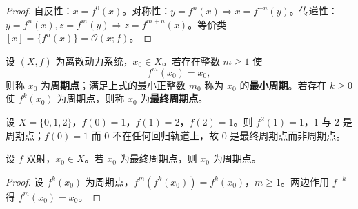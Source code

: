 \begin{proof}
自反性：$x=f^0(x)$。对称性：$y=f^n(x)\Rightarrow x=f^{-n}(y)$。传递性：$y=f^n(x),z=f^m(y)\Rightarrow z=f^{m+n}(x)$。等价类 $[x]=\{f^n(x)\}=\mathcal{O}(x;f)$。
\end{proof}

\begin{definition}[周期点与最终周期点]\label{def:periodic_point}
设 $(X,f)$ 为离散动力系统，$x_0\in X$。若存在整数 $m\ge 1$ 使
\[
f^m(x_0)=x_0,
\]
则称 $x_0$ 为\textbf{周期点}；满足上式的最小正整数 $m_0$ 称为 $x_0$ 的\textbf{最小周期}。若存在 $k\ge 0$ 使 $f^k(x_0)$ 为周期点，则称 $x_0$ 为\textbf{最终周期点}。
\end{definition}

\begin{example}[最终周期而非周期的点]\label{ex:eventually_periodic}
设 $X=\{0,1,2\}$，$f(0)=1$，$f(1)=2$，$f(2)=1$。则 $f^2(1)=1$，$1$ 与 $2$ 是周期点；$f(0)=1$ 而 $0$ 不在任何回归轨道上，故 $0$ 是最终周期点而非周期点。
\end{example}

\begin{lemma}[可逆演化中的回归]\label{lem:invertible_recurrence}
设 $f$ 双射，$x_0\in X$。若 $x_0$ 为最终周期点，则 $x_0$ 为周期点。
\end{lemma}

\begin{proof}
设 $f^k(x_0)$ 为周期点，$f^m(f^k(x_0))=f^k(x_0)$，$m\ge 1$。两边作用 $f^{-k}$ 得 $f^m(x_0)=x_0$。
\end{proof}

